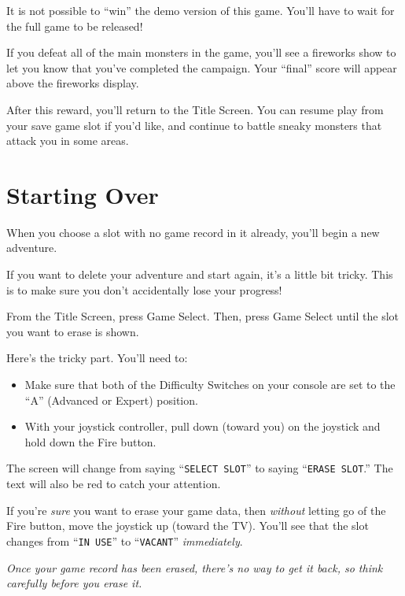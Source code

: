 \documentclass[12pt,openright,book]{memoir}
\begin{document}
It is not possible to ``win'' the demo version of this game. You'll have
to wait for the full game to be released!

\else

If  you  defeat  all of  the  main  monsters  in  the game,  you'll  see
a fireworks  show to let  you know  that you've completed  the campaign.
Your ``final'' score will appear above the fireworks display.

After this  reward, you'll return  to the  Title Screen. You  can resume
play from  your save  game slot  if you'd like,  and continue  to battle
sneaky monsters that attack you in some areas.

\fi

\section{Starting Over}\label{Starting Your Adventure Over}

When you choose a  slot with no game record in  it already, you'll begin
a new adventure.

If you want to delete your adventure  and start again, it's a little bit
tricky. This is to make sure you don't accidentally lose your progress!

From the Title Screen, press Game  Select. Then, press Game Select until
the slot you want to erase is shown.

Here's the tricky part. You'll need to:

\begin{itemize}
\item Make sure that both of the Difficulty Switches on your console
  are set to the ``A'' (Advanced or Expert) position.
\item With your joystick controller, pull down (toward you) on the
  joystick and hold down the Fire button.
\end{itemize}

The screen  will change from  saying ``\texttt{SELECT SLOT}''  to saying
``\texttt{ERASE  SLOT}.''   The  text   will  also   be  red   to  catch
your attention.

If  you're  \emph{sure}   you  want  to  erase  your   game  data,  then
\emph{without}  letting go  of the  Fire  button, move  the joystick  up
(toward  the TV).  You'll see  that the  slot changes  from ``\texttt{IN
  USE}'' to ``\texttt{VACANT}'' \emph{immediately}.

\emph{Once your  game record has been  erased, there's no way  to get it
  back, so think carefully before you erase it.}
\end{document}
